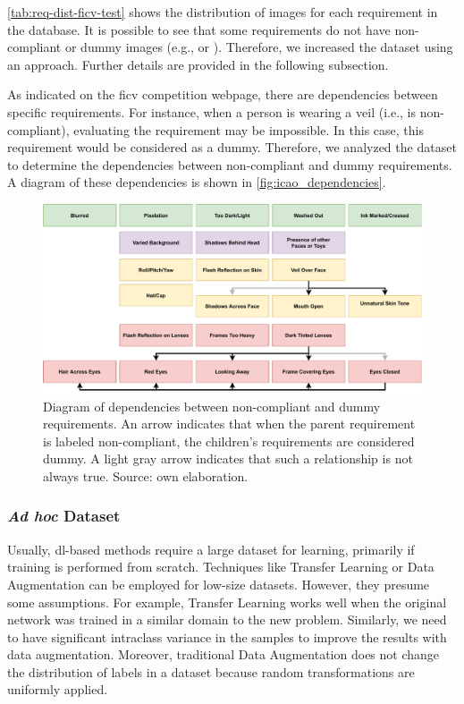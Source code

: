 \autoref{tab:req-dist-ficv-test} shows the distribution of images for each requirement in the \ficvtest database. It is possible to see that some requirements do not have non-compliant or dummy images (e.g., \inkmarked or \framestooheavy). Therefore, we increased the \ficvtest dataset using an \adhoc approach. Further details are provided in the following subsection.
 

 
As indicated on the \acs{ficv} competition webpage, there are dependencies between specific requirements. For instance, when a person is wearing a veil (i.e., \veiloverface is non-compliant), evaluating the requirement \mouthopen may be impossible. In this case, this requirement would be considered as a dummy. Therefore, we analyzed the \ficvtest dataset to determine the dependencies between non-compliant and dummy requirements. A diagram of these dependencies is shown in \autoref{fig:icao_dependencies}.
 
\begin{figure}[tb]
\centering
\includegraphics[width=\linewidth]{images/dataset/icao_dependencies.pdf}
\caption{Diagram of dependencies between non-compliant and dummy requirements. An arrow indicates that when the parent requirement is labeled non-compliant, the children’s requirements are considered dummy. A light gray arrow indicates that such a relationship is not always true. Source: own elaboration.}
\label{fig:icao_dependencies}
\end{figure}
 
\subsubsection{\textit{Ad hoc} Dataset} \label{sec:databaseadhoc}
 
Usually, \acl{dl}-based methods require a large dataset for learning, primarily if training is performed from scratch. Techniques like Transfer Learning or Data Augmentation can be employed for low-size datasets. However, they presume some assumptions. For example, Transfer Learning works well when the original network was trained in a similar domain to the new problem. Similarly, we need to have significant intraclass variance in the samples to improve the results with data augmentation. Moreover, traditional Data Augmentation does not change the distribution of labels in a dataset because random transformations are uniformly applied. 
 
